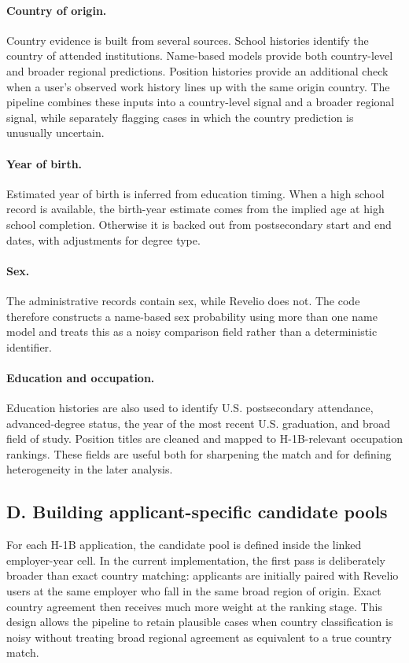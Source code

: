 \paragraph{Country of origin.}
Country evidence is built from several sources. School histories identify the country of attended institutions. Name-based models provide both country-level and broader regional predictions. Position histories provide an additional check when a user's observed work history lines up with the same origin country. The pipeline combines these inputs into a country-level signal and a broader regional signal, while separately flagging cases in which the country prediction is unusually uncertain.

\paragraph{Year of birth.}
Estimated year of birth is inferred from education timing. When a high school record is available, the birth-year estimate comes from the implied age at high school completion. Otherwise it is backed out from postsecondary start and end dates, with adjustments for degree type.

\paragraph{Sex.}
The administrative records contain sex, while Revelio does not. The code therefore constructs a name-based sex probability using more than one name model and treats this as a noisy comparison field rather than a deterministic identifier.

\paragraph{Education and occupation.}
Education histories are also used to identify U.S. postsecondary attendance, advanced-degree status, the year of the most recent U.S. graduation, and broad field of study. Position titles are cleaned and mapped to H-1B-relevant occupation rankings. These fields are useful both for sharpening the match and for defining heterogeneity in the later analysis.

\subsection{D. Building applicant-specific candidate pools}

For each H-1B application, the candidate pool is defined inside the linked employer-year cell. In the current implementation, the first pass is deliberately broader than exact country matching: applicants are initially paired with Revelio users at the same employer who fall in the same broad region of origin. Exact country agreement then receives much more weight at the ranking stage. This design allows the pipeline to retain plausible cases when country classification is noisy without treating broad regional agreement as equivalent to a true country match.

